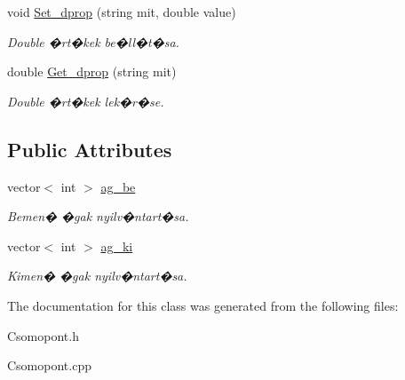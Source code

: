 \begin{DoxyCompactItemize}
\hypertarget{class_csomopont_af64637d5f8124e9f3d121c7d941140fe}{}\label{class_csomopont_af64637d5f8124e9f3d121c7d941140fe} 
void \hyperlink{class_csomopont_af64637d5f8124e9f3d121c7d941140fe}{Set\+\_\+dprop} (string mit, double value)
\begin{DoxyCompactList}\small\item\em Double �rt�kek be�ll�t�sa. \end{DoxyCompactList}\item 
\hypertarget{class_csomopont_aab439a6b1e8b645a1efa4be53d065f11}{}\label{class_csomopont_aab439a6b1e8b645a1efa4be53d065f11} 
double \hyperlink{class_csomopont_aab439a6b1e8b645a1efa4be53d065f11}{Get\+\_\+dprop} (string mit)
\begin{DoxyCompactList}\small\item\em Double �rt�kek lek�r�se. \end{DoxyCompactList}\end{DoxyCompactItemize}
\subsection*{Public Attributes}
\begin{DoxyCompactItemize}
\item 
\hypertarget{class_csomopont_a7244492608d916d60482d20dc58ea2ea}{}\label{class_csomopont_a7244492608d916d60482d20dc58ea2ea} 
vector$<$ int $>$ \hyperlink{class_csomopont_a7244492608d916d60482d20dc58ea2ea}{ag\+\_\+be}
\begin{DoxyCompactList}\small\item\em Bemen� �gak nyilv�ntart�sa. \end{DoxyCompactList}\item 
\hypertarget{class_csomopont_a656bdaccf4486a668bfc158d10553ddc}{}\label{class_csomopont_a656bdaccf4486a668bfc158d10553ddc} 
vector$<$ int $>$ \hyperlink{class_csomopont_a656bdaccf4486a668bfc158d10553ddc}{ag\+\_\+ki}
\begin{DoxyCompactList}\small\item\em Kimen� �gak nyilv�ntart�sa. \end{DoxyCompactList}\end{DoxyCompactItemize}


The documentation for this class was generated from the following files\+:\begin{DoxyCompactItemize}
\item 
Csomopont.\+h\item 
Csomopont.\+cpp\end{DoxyCompactItemize}

